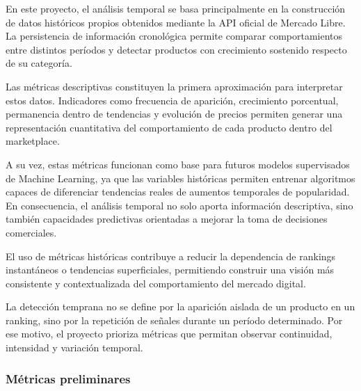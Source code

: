 En este proyecto, el análisis temporal se basa principalmente en la construcción de datos históricos propios obtenidos mediante la API oficial de Mercado Libre. La persistencia de información cronológica permite comparar comportamientos entre distintos períodos y detectar productos con crecimiento sostenido respecto de su categoría.

Las métricas descriptivas constituyen la primera aproximación para interpretar estos datos. Indicadores como frecuencia de aparición, crecimiento porcentual, permanencia dentro de tendencias y evolución de precios permiten generar una representación cuantitativa del comportamiento de cada producto dentro del marketplace.

A su vez, estas métricas funcionan como base para futuros modelos supervisados de Machine Learning, ya que las variables históricas permiten entrenar algoritmos capaces de diferenciar tendencias reales de aumentos temporales de popularidad. En consecuencia, el análisis temporal no solo aporta información descriptiva, sino también capacidades predictivas orientadas a mejorar la toma de decisiones comerciales.

El uso de métricas históricas contribuye a reducir la dependencia de rankings instantáneos o tendencias superficiales, permitiendo construir una visión más consistente y contextualizada del comportamiento del mercado digital.

La detección temprana no se define por la aparición aislada de un producto en un ranking, sino por la repetición de señales durante un período determinado. Por ese motivo, el proyecto prioriza métricas que permitan observar continuidad, intensidad y variación temporal.

\subsubsection{Métricas preliminares}

